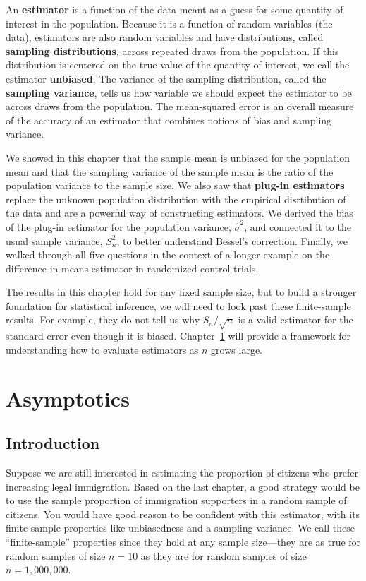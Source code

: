 \documentclass[
  13pt,
  letterpaper,
  DIV=11,
  numbers=noendperiod]{scrreprt}
\theoremstyle{plain}
\theoremstyle{plain}
\theoremstyle{definition}
\theoremstyle{definition}
\theoremstyle{remark}
\begin{document}
An \textbf{estimator} is a function of the data meant as a guess for
some quantity of interest in the population. Because it is a function of
random variables (the data), estimators are also random variables and
have distributions, called \textbf{sampling distributions}, across
repeated draws from the population. If this distribution is centered on
the true value of the quantity of interest, we call the estimator
\textbf{unbiased}. The variance of the sampling distribution, called the
\textbf{sampling variance}, tells us how variable we should expect the
estimator to be across draws from the population. The mean-squared error
is an overall measure of the accuracy of an estimator that combines
notions of bias and sampling variance.

We showed in this chapter that the sample mean is unbiased for the
population mean and that the sampling variance of the sample mean is the
ratio of the population variance to the sample size. We also saw that
\textbf{plug-in estimators} replace the unknown population distribution
with the empirical disrtibution of the data and are a powerful way of
constructing estimators. We derived the bias of the plug-in estimator
for the population variance, \(\widehat{\sigma}^2\), and connected it to
the usual sample variance, \(S_n^2\), to better understand Bessel's
correction. Finally, we walked through all five questions in the context
of a longer example on the difference-in-means estimator in randomized
control trials.

The results in this chapter hold for any fixed sample size, but to build
a stronger foundation for statistical inference, we will need to look
past these finite-sample results. For example, they do not tell us why
\(S_n/\sqrt{n}\) is a valid estimator for the standard error even though
it is biased. Chapter~\ref{sec-asymptotics} will provide a framework for
understanding how to evaluate estimators as \(n\) grows large.

\chapter{Asymptotics}\label{sec-asymptotics}

\section{Introduction}\label{introduction-2}

Suppose we are still interested in estimating the proportion of citizens
who prefer increasing legal immigration. Based on the last chapter, a
good strategy would be to use the sample proportion of immigration
supporters in a random sample of citizens. You would have good reason to
be confident with this estimator, with its finite-sample properties like
unbiasedness and a sampling variance. We call these ``finite-sample''
properties since they hold at any sample size---they are as true for
random samples of size \(n = 10\) as they are for random samples of size
\(n = 1{,}000{,}000\).
\end{document}
